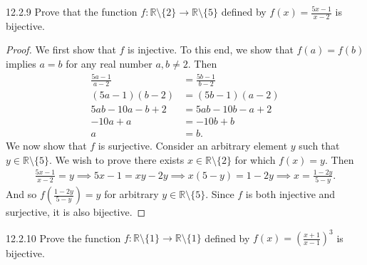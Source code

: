 \documentclass{exam}
\newcommand{\paren}[1]{\left(#1\right)}
\begin{document}
\begin{problem}{12.2.9}
    Prove that the function $f:\mathbb R\setminus\{2\}\rightarrow\mathbb R\setminus\{5\}$ defined by $f(x)=\frac{5x-1}{x-2}$ is bijective.
\end{problem}

\begin{proof}
    We first show that $f$ is injective. To this end, we show that $f(a) = f(b)$ implies $a = b$ for any real number $a, b\neq 2$. Then
    \begin{align*}
        \frac{5a-1}{a-2} &= \frac{5b-1}{b-2}\\
        (5a-1)(b-2)&=(5b-1)(a-2)\\
        5ab - 10a - b + 2 &= 5ab - 10b - a + 2\\
        -10a + a &= -10b + b\\
        a &= b.
    \end{align*}
    We now show that $f$ is surjective. Consider an arbitrary element $y$ such that $y\in\mathbb R\setminus\{5\}$. We wish to prove there exists $x\in\mathbb R\setminus\{2\}$ for which $f(x) = y$. Then
    \begin{align*}
        \frac{5x-1}{x-2} = y \implies 5x-1 = xy-2y\implies x(5-y) = 1-2y\implies x = \frac{1-2y}{5-y}.
    \end{align*}
    And so $f(\frac{1-2y}{5-y}) = y$ for arbitrary $y\in\mathbb R\setminus\{5\}$. Since $f$ is both injective and surjective, it is also bijective.
\end{proof}

\begin{problem}{12.2.10}
    Prove the function $f:\mathbb R\setminus\{1\}\rightarrow\mathbb R\setminus\{1\}$ defined by $f(x)=\paren{\frac{x+1}{x-1}}^3$ is bijective.
\end{problem}
\end{document}
